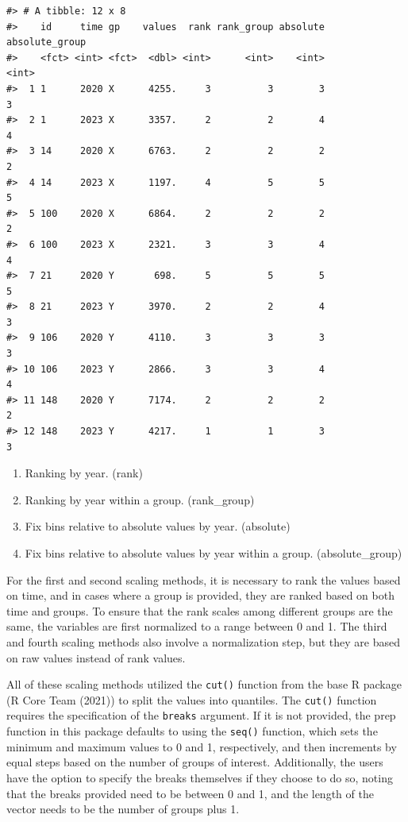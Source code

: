 \begin{verbatim}
#> # A tibble: 12 x 8
#>    id     time gp    values  rank rank_group absolute absolute_group
#>    <fct> <int> <fct>  <dbl> <int>      <int>    <int>          <int>
#>  1 1      2020 X      4255.     3          3        3              3
#>  2 1      2023 X      3357.     2          2        4              4
#>  3 14     2020 X      6763.     2          2        2              2
#>  4 14     2023 X      1197.     4          5        5              5
#>  5 100    2020 X      6864.     2          2        2              2
#>  6 100    2023 X      2321.     3          3        4              4
#>  7 21     2020 Y       698.     5          5        5              5
#>  8 21     2023 Y      3970.     2          2        4              3
#>  9 106    2020 Y      4110.     3          3        3              3
#> 10 106    2023 Y      2866.     3          3        4              4
#> 11 148    2020 Y      7174.     2          2        2              2
#> 12 148    2023 Y      4217.     1          1        3              3
\end{verbatim}

\begin{enumerate}
\def\labelenumi{\arabic{enumi}.}
\tightlist
\item
  Ranking by year. (rank)
\item
  Ranking by year within a group. (rank\_group)
\item
  Fix bins relative to absolute values by year. (absolute)
\item
  Fix bins relative to absolute values by year within a group. (absolute\_group)
\end{enumerate}

For the first and second scaling methods, it is necessary to rank the values based on time, and in cases where a group is provided, they are ranked based on both time and groups. To ensure that the rank scales among different groups are the same, the variables are first normalized to a range between 0 and 1. The third and fourth scaling methods also involve a normalization step, but they are based on raw values instead of rank values.

All of these scaling methods utilized the \texttt{cut()} function from the base R package (R Core Team (2021)) to split the values into quantiles. The \texttt{cut()} function requires the specification of the \texttt{breaks} argument. If it is not provided, the prep function in this package defaults to using the \texttt{seq()} function, which sets the minimum and maximum values to 0 and 1, respectively, and then increments by equal steps based on the number of groups of interest. Additionally, the users have the option to specify the breaks themselves if they choose to do so, noting that the breaks provided need to be between 0 and 1, and the length of the vector needs to be the number of groups plus 1.

